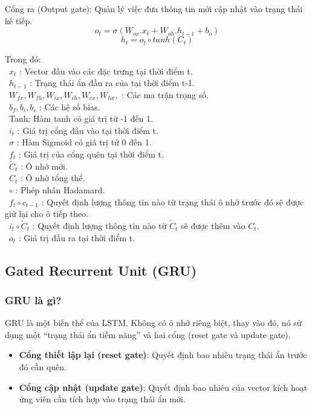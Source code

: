 \documentclass[conference]{IEEEtran}
\begin{document}
Cổng ra (Output gate): Quản lý việc đưa thông tin mới cập nhật vào trạng thái kế tiếp.
\[o_t=\sigma(W_{ox}.x_t+W_{oh}.h_{t-1}+b_o)\]
\[h_t=o_t\circ tanh(C_t)\]

Trong đó:\\
\indent\textbullet\ \(x_t\) : Vector đầu vào các đặc trưng tại thời điểm t.\\
\indent\textbullet\ \(h_{t-1}\) : Trạng thái ẩn đầu ra của tại thời điểm t-1.\\
\indent\textbullet\ \(W_{fx},W_{fh},W_{ix},W_{ih},W_{cx},W_{hx},\) : Các ma trận trọng số.\\
\indent\textbullet\ \(b_f,b_i, b_c \) : Các hệ số bias.\\
\indent\textbullet\ Tanh: Hàm tanh có giá trị tử -1 đến 1.\\
\indent\textbullet\ \(i_t\) : Giá trị cổng đầu vào tại thời điểm t.\\
\indent\textbullet\ \(\sigma\) : Hàm Sigmoid có giá trị tử 0 đến 1.\\
\indent\textbullet\ \(f_t\) : Giá trị của cổng quên tại thời điểm t.\\
\indent\textbullet\ \(\widetilde{C}_t \) : Ô nhớ mới.\\
\indent\textbullet\ \(C_t \) : Ô nhớ tổng thể.\\
\indent\textbullet\ \(\circ\) : Phép nhân Hadamard.\\
\indent\textbullet\ \(f_t\circ c_{t-1}\) : Quyết định lượng thông tin nào từ trạng thái ô nhớ trước đó sẽ được giữ lại cho ô tiếp theo.\\
\indent\textbullet\ \(i_t\circ{\widetilde{C}}_t\) : Quyết định lượng thông tin nào từ \({\widetilde{C}}_t\) sẽ được thêm vào \(C_t\).\\
\indent\textbullet\ \(o_t \) : Giá trị đầu ra tại thời điểm t.


\subsection{Gated Recurrent Unit (GRU)}
\subsubsection{GRU là gì?}
GRU là một biến thể của LSTM. Không có ô nhớ riêng biệt, thay vào đó, nó sử dụng một “trạng thái ẩn tiềm năng” và hai cổng (reset gate và update gate).


\begin{itemize}
    \item \textbf{Cổng thiết lập lại (reset gate)}: Quyết định bao nhiêu trạng thái ẩn trước đó cần quên.
    \item \textbf{Cổng cập nhật (update gate)}: Quyết định bao nhiêu của vector kích hoạt ứng viên cần tích hợp vào trạng thái ẩn mới.
\end{itemize}
\end{document}
